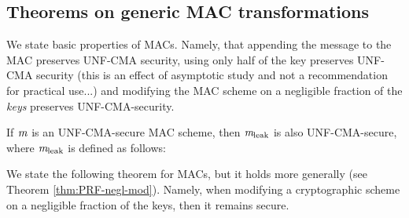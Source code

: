 \subsection{Theorems on generic MAC transformations}
We state basic properties of MACs. Namely, that appending the message to the MAC preserves UNF-CMA security, using only half of the key preserves UNF-CMA security (this is an effect of asymptotic study and not a recommendation for practical use...) and modifying the MAC
scheme on a negligible fraction of the \emph{keys} preserves UNF-CMA-security.

\begin{theorem}
If $\mathit{{m}}$ is an UNF-CMA-secure MAC scheme, then $\mathit{{m}}_{\text{leak}}$ is also UNF-CMA-secure, where $\mathit{{m}}_{\text{leak}}$ is defined as follows:
\begin{center}
\begin{pchstack}
\pchspace
{}
\end{pchstack}
\end{center}
\end{theorem}

We state the following theorem for MACs, but it holds more generally (see Theorem \ref{thm:PRF-negl-mod}). Namely, when modifying a cryptographic scheme on a negligible fraction of the keys, then it remains secure.

